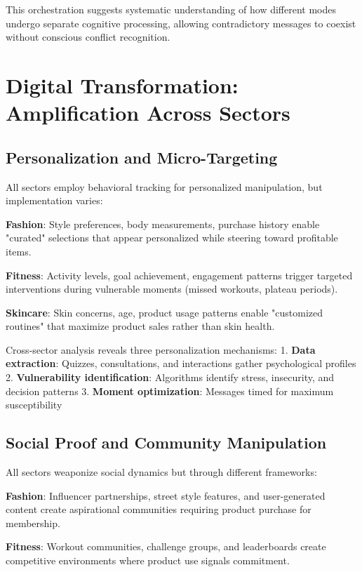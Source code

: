This orchestration suggests systematic understanding of how different modes undergo separate cognitive processing, allowing contradictory messages to coexist without conscious conflict recognition.

\section{Digital Transformation: Amplification Across Sectors}
\label{sec:digital_patterns}

\subsection{Personalization and Micro-Targeting}

All sectors employ behavioral tracking for personalized manipulation, but implementation varies:

\textbf{Fashion}: Style preferences, body measurements, purchase history enable "curated" selections that appear personalized while steering toward profitable items.

\textbf{Fitness}: Activity levels, goal achievement, engagement patterns trigger targeted interventions during vulnerable moments (missed workouts, plateau periods).

\textbf{Skincare}: Skin concerns, age, product usage patterns enable "customized routines" that maximize product sales rather than skin health.

Cross-sector analysis reveals three personalization mechanisms:
1. \textbf{Data extraction}: Quizzes, consultations, and interactions gather psychological profiles
2. \textbf{Vulnerability identification}: Algorithms identify stress, insecurity, and decision patterns
3. \textbf{Moment optimization}: Messages timed for maximum susceptibility

\subsection{Social Proof and Community Manipulation}

All sectors weaponize social dynamics but through different frameworks:

\textbf{Fashion}: Influencer partnerships, street style features, and user-generated content create aspirational communities requiring product purchase for membership.

\textbf{Fitness}: Workout communities, challenge groups, and leaderboards create competitive environments where product use signals commitment.

